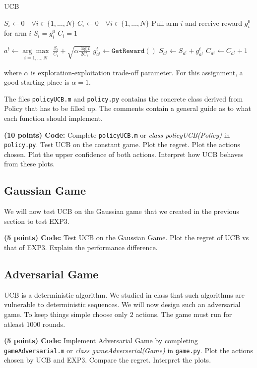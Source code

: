 \documentclass{article}
\begin{document}
\begin{algorithm}[H]
    \caption{UCB}
    
    $S_i \gets 0 \quad \forall i \in \{1, \dotsc, N\}$\;
    $C_i \gets 0 \quad \forall i \in \{1, \dotsc, N\}$\;
    {
        Pull arm $i$ and receive reward $g_i^0$ for arm $i$\;
        $S_i = g_i^0$\;
        $C_i = 1$\;
    }
    
    {
    	$a^t \gets \underset{i=1,\dots,N}{\arg \max} \; \frac{S_i}{C_i}  + \sqrt{ \alpha \frac{\log t}{2C_i}} $\;
    	$g^t_{a^t} \gets \mathtt{GetReward}()$\;
    	$S_{a^t} \gets S_{a^t} + g^t_{a^t} $\;
    	$C_{a^t} \gets C_{a^t} + 1$\;
    }
\end{algorithm}
\noindent where $\alpha$ is exploration-exploitation trade-off parameter. For this assignment, a good starting place is $\alpha = 1$.

The files \texttt{policyUCB.m} and \texttt{policy.py} contains the concrete class derived from Policy that has to be filled up. The comments contain a general guide as to what each function should implement.

\noindent\textbf{(10 points) Code:} Complete \texttt{policyUCB.m} or \textit{class policyUCB(Policy)} in \texttt{policy.py}. Test UCB on the constant game. Plot the regret. Plot the actions chosen. Plot the upper confidence of both actions. Interpret how UCB behaves from these plots.

\subsection{Gaussian Game}

We will now test UCB on the Gaussian game that we created in the previous section to test EXP3. 

\noindent\textbf{(5 points) Code:} Test UCB on the Gaussian Game. Plot the regret of UCB vs that of EXP3. Explain the performance difference.

\subsection{Adversarial Game}

UCB is a deterministic algorithm. We studied in class that such algorithms are vulnerable to deterministic sequences. We will now design such an adversarial game.
To keep things simple choose only $2$ actions. The game must run for atleast $1000$ rounds.

\noindent\textbf{(5 points) Code:} Implement Adversarial Game by completing \texttt{gameAdversarial.m} or \textit{class gameAdverserial(Game)} in \texttt{game.py}. Plot the actions chosen by UCB and EXP3. Compare the regret. Interpret the plots.
\end{document}
